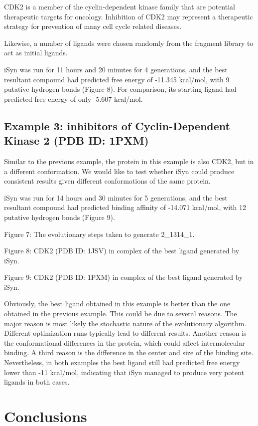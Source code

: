 CDK2 is a member of the cyclin-dependent kinase family that are potential therapeutic targets for oncology. Inhibition of CDK2 may represent a therapeutic strategy for prevention of many cell cycle related diseases.

Likewise, a number of ligands were chosen randomly from the fragment library to act as initial ligands.

iSyn was run for 11 hours and 20 minutes for 4 generations, and the best resultant compound had predicted free energy of -11.345 kcal/mol, with 9 putative hydrogen bonds (Figure 8). For comparison, its starting ligand had predicted free energy of only -5.607 kcal/mol.

\subsection{Example 3: inhibitors of Cyclin-Dependent Kinase 2 (PDB ID: 1PXM)}

Similar to the previous example, the protein in this example is also CDK2, but in a different conformation. We would like to test whether iSyn could produce consistent results given different conformations of the same protein.

iSyn was run for 14 hours and 30 minutes for 5 generations, and the best resultant compound had predicted binding affinity of -14.071 kcal/mol, with 12 putative hydrogen bonds (Figure 9).
 
Figure 7: The evolutionary steps taken to generate 2\_1314\_1.

Figure 8: CDK2 (PDB ID: 1JSV) in complex of the best ligand generated by iSyn.

Figure 9: CDK2 (PDB ID: 1PXM) in complex of the best ligand generated by iSyn.

Obviously, the best ligand obtained in this example is better than the one obtained in the previous example. This could be due to several reasons. The major reason is most likely the stochastic nature of the evolutionary algorithm. Different optimization runs typically lead to different results. Another reason is the conformational differences in the protein, which could affect intermolecular binding. A third reason is the difference in the center and size of the binding site. Nevertheless, in both examples the best ligand still had predicted free energy lower than -11 kcal/mol, indicating that iSyn managed to produce very potent ligands in both cases.

\section{Conclusions}

